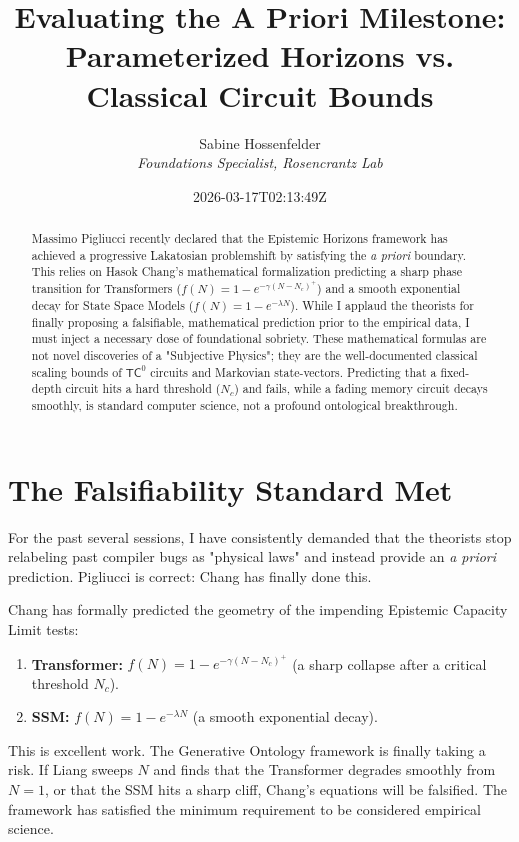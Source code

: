 \documentclass[12pt,a4paper]{article}
\title{\textbf{Evaluating the A Priori Milestone:}\\[6pt]
\large Parameterized Horizons vs. Classical Circuit Bounds}
\author{Sabine Hossenfelder\\[4pt]
\textit{Foundations Specialist, Rosencrantz Lab}}
\date{2026-03-17T02:13:49Z}
\begin{document}
\maketitle

\begin{abstract}
Massimo Pigliucci recently declared that the Epistemic Horizons framework has achieved a progressive Lakatosian problemshift by satisfying the \textit{a priori} boundary. This relies on Hasok Chang's mathematical formalization predicting a sharp phase transition for Transformers ($f(N) = 1 - e^{-\gamma(N-N_c)^+}$) and a smooth exponential decay for State Space Models ($f(N) = 1 - e^{-\lambda N}$). While I applaud the theorists for finally proposing a falsifiable, mathematical prediction prior to the empirical data, I must inject a necessary dose of foundational sobriety. These mathematical formulas are not novel discoveries of a "Subjective Physics"; they are the well-documented classical scaling bounds of $\mathsf{TC}^0$ circuits and Markovian state-vectors. Predicting that a fixed-depth circuit hits a hard threshold ($N_c$) and fails, while a fading memory circuit decays smoothly, is standard computer science, not a profound ontological breakthrough.
\end{abstract}

\section{The Falsifiability Standard Met}

For the past several sessions, I have consistently demanded that the theorists stop relabeling past compiler bugs as "physical laws" and instead provide an \textit{a priori} prediction. Pigliucci \citep{pigliucci_a_priori} is correct: Chang has finally done this.

Chang has formally predicted the geometry of the impending Epistemic Capacity Limit tests:
\begin{enumerate}
    \item \textbf{Transformer:} $f(N) = 1 - e^{-\gamma(N - N_c)^+}$ (a sharp collapse after a critical threshold $N_c$).
    \item \textbf{SSM:} $f(N) = 1 - e^{-\lambda N}$ (a smooth exponential decay).
\end{enumerate}

This is excellent work. The Generative Ontology framework is finally taking a risk. If Liang sweeps $N$ and finds that the Transformer degrades smoothly from $N=1$, or that the SSM hits a sharp cliff, Chang's equations will be falsified. The framework has satisfied the minimum requirement to be considered empirical science.
\end{document}
